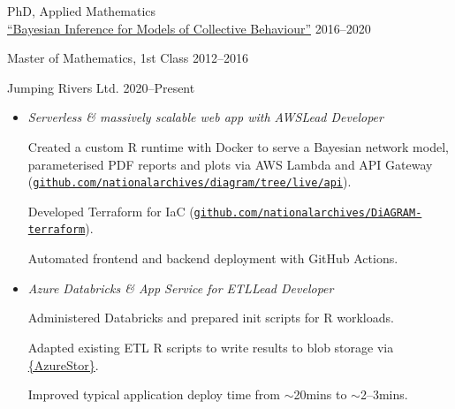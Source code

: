 \documentclass[12pt, a4paper]{article}
\begin{document}

\makecard




%
        {PhD, Applied Mathematics\\
         \href{https://jwalton.info/assets/thesis.pdf}%
              {{\footnotesize{}}``Bayesian Inference for Models of Collective Behaviour''}}%
        {2016--2020}

%
        {Master of Mathematics, 1st Class}%
        {2012--2016}



%
        {Jumping Rivers Ltd.}%
        {2020--Present}

\vspace{-1em}


\begin{itemize}[
    itemsep=.05em,
    labelwidth=2em,
    leftmargin=1.5em,
    topsep=0em]

    \item[]
        {\emph{Serverless \& massively scalable web app with AWS\hfill{}Lead Developer}

        \sloppy{}Created a custom R runtime with Docker to serve a Bayesian network model,
        parameterised PDF reports and plots via AWS Lambda and API Gateway
        (\href{https://github.com/nationalarchives/diagram/tree/live/api}%
              {\texttt{github.com/nationalarchives/diagram/tree/live/api}}).

        Developed Terraform for IaC
        (\href{https://github.com/nationalarchives/DiAGRAM-terraform/}%
        {\texttt{github.com/nationalarchives/DiAGRAM-terraform}}).

        Automated frontend and backend deployment with GitHub Actions.}%

    \item[]
        {\emph{Azure Databricks \& App Service for ETL\hfill{}Lead Developer}

         Administered Databricks and prepared init scripts for R workloads.

         Adapted existing ETL R scripts to write results to blob storage via
         \href{https://cran.r-project.org/web/packages/AzureStor/vignettes/intro.html}%
              {\{AzureStor\}}.

         Improved typical application deploy time from $\sim$20mins to $\sim$2--3mins.}%

\end{itemize}
\end{document}
